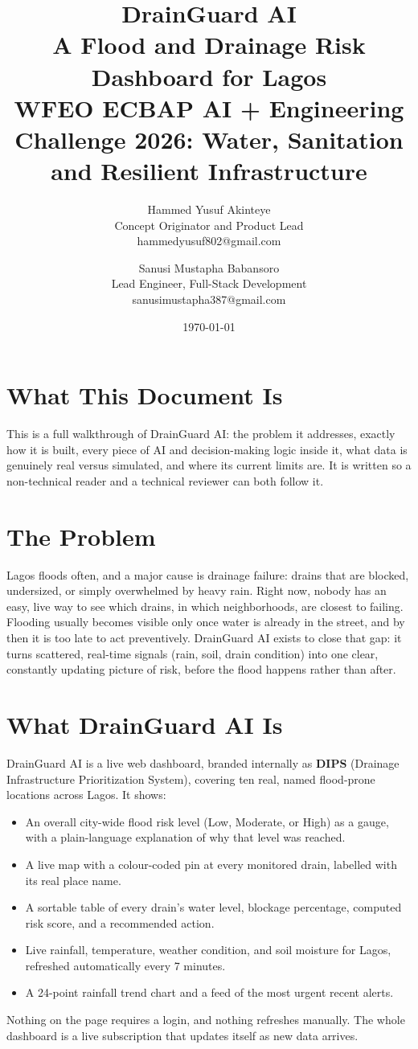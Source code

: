 \documentclass[11pt]{article}
\title{\textbf{DrainGuard AI} \\[4pt] \large A Flood and Drainage Risk Dashboard for Lagos \\[2pt] \normalsize WFEO ECBAP AI + Engineering Challenge 2026: Water, Sanitation and Resilient Infrastructure}
\author{
Hammed Yusuf Akinteye \\ \small Concept Originator and Product Lead \\ \small hammedyusuf802@gmail.com
\and
Sanusi Mustapha Babansoro \\ \small Lead Engineer, Full-Stack Development \\ \small sanusimustapha387@gmail.com
}
\date{\small \today}
\begin{document}
\maketitle

\section*{What This Document Is}
This is a full walkthrough of DrainGuard AI: the problem it addresses, exactly how it is built, every piece of AI and decision-making logic inside it, what data is genuinely real versus simulated, and where its current limits are. It is written so a non-technical reader and a technical reviewer can both follow it.

\tableofcontents

\section{The Problem}
Lagos floods often, and a major cause is drainage failure: drains that are blocked, undersized, or simply overwhelmed by heavy rain. Right now, nobody has an easy, live way to see which drains, in which neighborhoods, are closest to failing. Flooding usually becomes visible only once water is already in the street, and by then it is too late to act preventively. DrainGuard AI exists to close that gap: it turns scattered, real-time signals (rain, soil, drain condition) into one clear, constantly updating picture of risk, before the flood happens rather than after.

\section{What DrainGuard AI Is}
DrainGuard AI is a live web dashboard, branded internally as \textbf{DIPS} (Drainage Infrastructure Prioritization System), covering ten real, named flood-prone locations across Lagos. It shows:
\begin{itemize}
  \item An overall city-wide flood risk level (Low, Moderate, or High) as a gauge, with a plain-language explanation of why that level was reached.
  \item A live map with a colour-coded pin at every monitored drain, labelled with its real place name.
  \item A sortable table of every drain's water level, blockage percentage, computed risk score, and a recommended action.
  \item Live rainfall, temperature, weather condition, and soil moisture for Lagos, refreshed automatically every 7 minutes.
  \item A 24-point rainfall trend chart and a feed of the most urgent recent alerts.
\end{itemize}
Nothing on the page requires a login, and nothing refreshes manually. The whole dashboard is a live subscription that updates itself as new data arrives.
\end{document}
